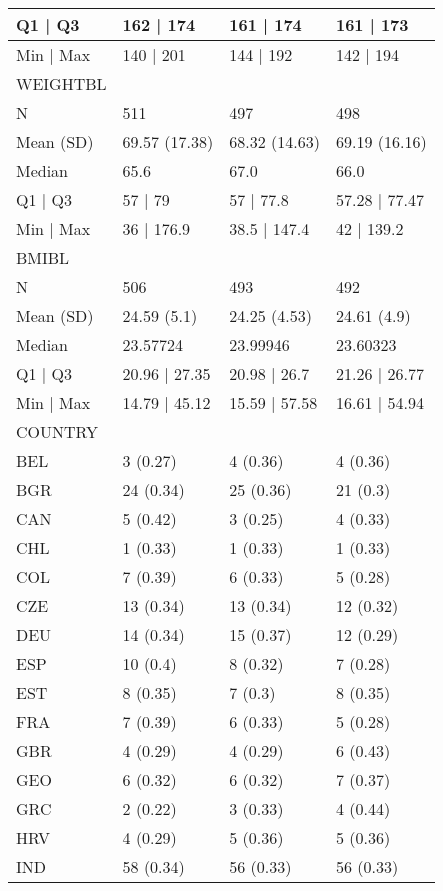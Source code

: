 \documentclass[]{article}
\begin{document}
\begin{table}
{\begin{tabular}[t]{l|l|l|l}
\hline
Q1 | Q3 & 162 | 174 & 161 | 174 & 161 | 173\\
\hline
Min | Max & 140 | 201 & 144 | 192 & 142 | 194\\
\hline
WEIGHTBL &  &  & \\
\hline
N & 511 & 497 & 498\\
\hline
Mean (SD) & 69.57 (17.38) & 68.32 (14.63) & 69.19 (16.16)\\
\hline
Median & 65.6 & 67.0 & 66.0\\
\hline
Q1 | Q3 & 57 | 79 & 57 | 77.8 & 57.28 | 77.47\\
\hline
Min | Max & 36 | 176.9 & 38.5 | 147.4 & 42 | 139.2\\
\hline
BMIBL &  &  & \\
\hline
N & 506 & 493 & 492\\
\hline
Mean (SD) & 24.59 (5.1) & 24.25 (4.53) & 24.61 (4.9)\\
\hline
Median & 23.57724 & 23.99946 & 23.60323\\
\hline
Q1 | Q3 & 20.96 | 27.35 & 20.98 | 26.7 & 21.26 | 26.77\\
\hline
Min | Max & 14.79 | 45.12 & 15.59 | 57.58 & 16.61 | 54.94\\
\hline
COUNTRY &  &  & \\
\hline
BEL & 3 (0.27) & 4 (0.36) & 4 (0.36)\\
\hline
BGR & 24 (0.34) & 25 (0.36) & 21 (0.3)\\
\hline
CAN & 5 (0.42) & 3 (0.25) & 4 (0.33)\\
\hline
CHL & 1 (0.33) & 1 (0.33) & 1 (0.33)\\
\hline
COL & 7 (0.39) & 6 (0.33) & 5 (0.28)\\
\hline
CZE & 13 (0.34) & 13 (0.34) & 12 (0.32)\\
\hline
DEU & 14 (0.34) & 15 (0.37) & 12 (0.29)\\
\hline
ESP & 10 (0.4) & 8 (0.32) & 7 (0.28)\\
\hline
EST & 8 (0.35) & 7 (0.3) & 8 (0.35)\\
\hline
FRA & 7 (0.39) & 6 (0.33) & 5 (0.28)\\
\hline
GBR & 4 (0.29) & 4 (0.29) & 6 (0.43)\\
\hline
GEO & 6 (0.32) & 6 (0.32) & 7 (0.37)\\
\hline
GRC & 2 (0.22) & 3 (0.33) & 4 (0.44)\\
\hline
HRV & 4 (0.29) & 5 (0.36) & 5 (0.36)\\
\hline
IND & 58 (0.34) & 56 (0.33) & 56 (0.33)\\

\end{tabular}}
\end{table}
\end{document}
